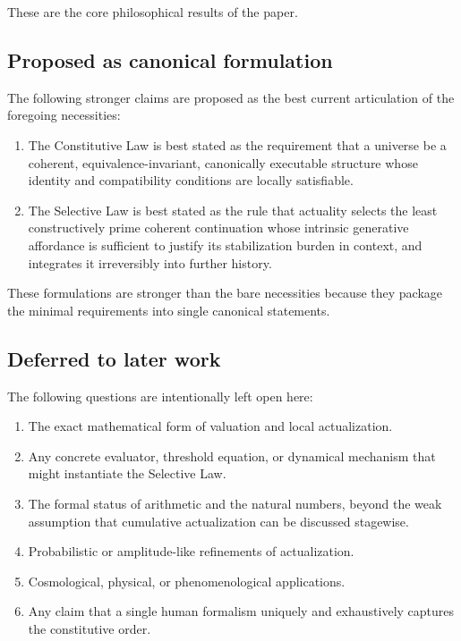 \documentclass[11pt]{article}
\theoremstyle{foundation}
\begin{document}
These are the core philosophical results of the paper.

\subsection{Proposed as canonical formulation}

The following stronger claims are proposed as the best current articulation of the foregoing necessities:

\begin{enumerate}
    \item The Constitutive Law is best stated as the requirement that a universe be a coherent, equivalence-invariant, canonically executable structure whose identity and compatibility conditions are locally satisfiable.
    \item The Selective Law is best stated as the rule that actuality selects the least constructively prime coherent continuation whose intrinsic generative affordance is sufficient to justify its stabilization burden in context, and integrates it irreversibly into further history.
\end{enumerate}

These formulations are stronger than the bare necessities because they package the minimal requirements into single canonical statements.

\subsection{Deferred to later work}

The following questions are intentionally left open here:

\begin{enumerate}
    \item The exact mathematical form of valuation and local actualization.
    \item Any concrete evaluator, threshold equation, or dynamical mechanism that might instantiate the Selective Law.
    \item The formal status of arithmetic and the natural numbers, beyond the weak assumption that cumulative actualization can be discussed stagewise.
    \item Probabilistic or amplitude-like refinements of actualization.
    \item Cosmological, physical, or phenomenological applications.
    \item Any claim that a single human formalism uniquely and exhaustively captures the constitutive order.
\end{enumerate}
\end{document}
